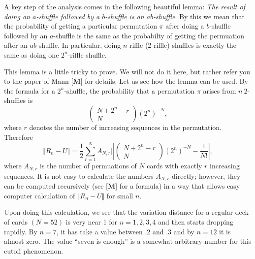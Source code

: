 \documentclass{stml-l}
\theoremstyle{definition}
\numberwithin{equation}{chapter}
\numberwithin{figure}{chapter}
\numberwithin{figure}{section}
\begin{document}
A key step of the analysis comes in the following beautiful lemma:
\emph{The result of doing an $a$-shuffle followed by a $b$-shuffle
is an $ab$-shuffle}. By this we mean that the probability of getting
a particular permutation $\pi$ after doing a $b$-shuffle followed by
an $a$-shuffle is the same as the probabilty of getting the
permuation after an $ab$-shuffle. In particular, doing $n$ riffle
(2-riffle) shuffles is exactly the same as doing one $2^{n}$-riffle
shuffle.

This lemma is a little tricky to prove. We will not do it here, but
rather refer you to the paper of Mann [\textbf{M}] for details. Let
us see how the lemma can be used. By the formula for a
$2^{n}$-shuffle, the probability that a permutation $\pi$ arises
from $n\    2$-shuffles is
\begin{equation*}
\left(\begin{matrix}N + 2^{n}-r\\ N \end{matrix}\right)
(2^{n})^{-N},
\end{equation*}
where $r$ denotes the number of increasing sequences in the
permutation. Therefore
\begin{equation*}
\Vert R_{n}-U\Vert=\frac{1}{2}\sum\limits_{r=1}^{N}A_{N,r}|\left|
\left(\begin{matrix}N + 2^{n}-r\\ N\end{matrix}\right)
(2^{n})^{-N}-\frac{1}{N!}\right|,
\end{equation*}
where $A_{N,r}$ is the number of permuations of $N$ cards with
exactly $r$ increasing sequences. It is not easy to calculate the
numbers $A_{N,r}$ directly; however, they can be computed
recursively (see [\textbf{M}] for a formula) in a way that allows
easy computer calculation of $\Vert R_{n}-U\Vert$ for small $n$.

Upon doing this calculation, we see that the variation distance for
a regular deck of cards $(N=52)$ is very near 1 for $n=1,2,3,4$ and
then starts dropping rapidly. By $n=7$, it has take a value
between .2 and .3 and by $n=12$ it is almost zero. The value ``seven
is enough'' is a somewhat arbitrary number for this cutoff
phenomenon.
\end{document}

